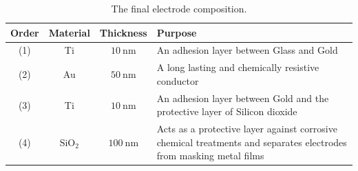 \documentclass[final]{jyflluk}
\begin{document}
\begin{table}[h]
    \centering
    \caption{The final electrode composition.}
    \label{tab:electrde}
    \begin{tabular}{||c c c p{10cm}||} \toprule
       Order    & Material & Thickness & Purpose\\ \midrule
       (1)   &  Ti  &  $\SI{10}{\nano \metre}$  & An adhesion layer between Glass and Gold     \\ \hline
       (2)  &  Au  &  $\SI{50}{\nano \metre}$ & A long lasting and chemically resistive conductor \\\hline
       (3)  &  Ti  &  $\SI{10}{\nano \metre}$ & An adhesion layer between Gold and the protective layer of Silicon dioxide\\\hline
       (4)   &  $\mathrm{SiO_2}$  &  $\SI{100}{\nano \metre}$  & Acts as a protective layer against corrosive chemical treatments and separates electrodes from masking metal films    \\
         \bottomrule
    \end{tabular}
 \end{table}
\end{document}
